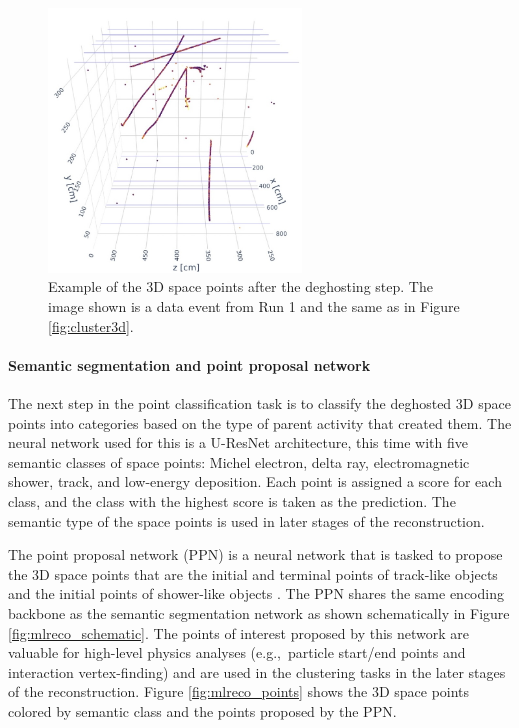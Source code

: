 \begin{figure}
    \centering
    \includegraphics[width=0.6\textwidth]{figures/mlreco/mlreco_deghosted.jpg}
    \caption{Example of the 3D space points after the deghosting step. The image shown is a data event from Run 1 and the same as in Figure \ref{fig:cluster3d}.}
    \label{fig:deghosted}
\end{figure}

\paragraph{Semantic segmentation and point proposal network}
The next step in the point classification task is to classify the deghosted 3D space points into categories based on the type of parent activity that created them. The neural network used for this is a U-ResNet architecture, this time with five semantic classes of space points: Michel electron, delta ray, electromagnetic shower, track, and low-energy deposition. Each point is assigned a score for each class, and the class with the highest score is taken as the prediction. The semantic type of the space points is used in later stages of the reconstruction.

The point proposal network (PPN) is a neural network that is tasked to propose the 3D space points that are the initial and terminal points of track-like objects and the initial points of shower-like objects \cite{Domine2020a}. The PPN shares the same encoding backbone as the semantic segmentation network as shown schematically in Figure \ref{fig:mlreco_schematic}. The points of interest proposed by this network are valuable for high-level physics analyses (e.g.,\ particle start/end points and interaction vertex-finding) and are used in the clustering tasks in the later stages of the reconstruction. Figure \ref{fig:mlreco_points} shows the 3D space points colored by semantic class and the points proposed by the PPN.

